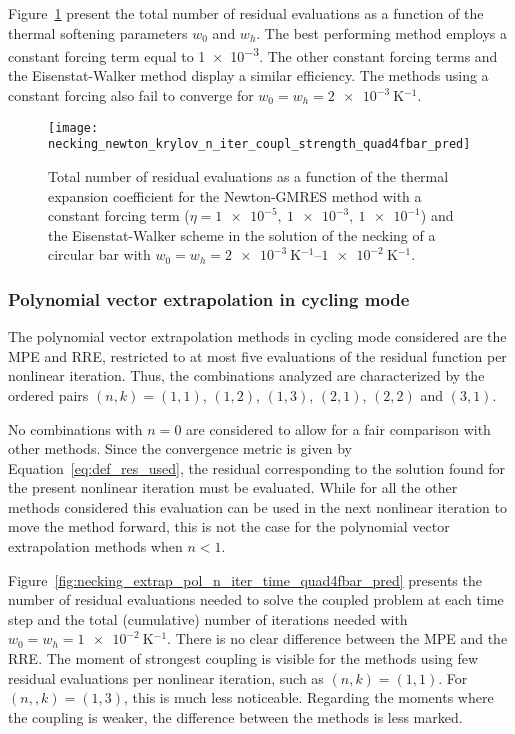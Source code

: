 Figure~\ref{fig:necking_newton_krylov_n_iter_coupl_strength_quad4fbar_pred} present the total number of residual evaluations as a function of the thermal softening parameters \(w_0\) and \(w_h\).
The best performing method employs a constant forcing term equal to \num{1e-3}.
The other constant forcing terms and the Eisenstat-Walker method display a similar efficiency.
The methods using a constant forcing also fail to converge for \(w_0=w_h=\SI{2e-3}{\kelvin^{-1}}\).

\begin{figure}
 \centering
 \texttt{[image: necking\_newton\_krylov\_n\_iter\_coupl\_strength\_quad4fbar\_pred]}
 \caption{Total number of residual evaluations as a function of the thermal expansion coefficient for the Newton-GMRES method with a constant forcing term (\(\eta=\num{1e-5},\ \num{1e-3},\ \num{1e-1}\)) and the Eisenstat-Walker scheme in the solution of the necking of a circular bar with \(w_0=w_h=\SIrange{2e-3}{1e-2}{\kelvin^{-1}}\).}
\label{fig:necking_newton_krylov_n_iter_coupl_strength_quad4fbar_pred}
\end{figure}

\FloatBarrier

\subsubsection{Polynomial vector extrapolation in cycling mode}

The polynomial vector extrapolation methods in cycling mode considered are the MPE and RRE, restricted to at most five evaluations of the residual function per nonlinear iteration.
Thus, the combinations analyzed are characterized by the ordered pairs \((n,k)=(1,1)\), \((1,2)\), \((1,3)\), \((2,1)\), \((2,2)\) and \((3,1)\).

No combinations with \(n=0\) are considered to allow for a fair comparison with other methods.
Since the convergence metric is given by Equation~\eqref{eq:def_res_used}, the residual corresponding to the solution found for the present nonlinear iteration must be evaluated.
While for all the other methods considered this evaluation can be used in the next nonlinear iteration to move the method forward, this is not the case for the polynomial vector extrapolation methods when \(n<1\).

Figure~\ref{fig:necking_extrap_pol_n_iter_time_quad4fbar_pred} presents the number of residual evaluations needed to solve the coupled problem at each time step and the total (cumulative) number of iterations needed with \(w_0=w_h=\SI{1e-2}{\kelvin^{-1}}\).
There is no clear difference between the MPE and the RRE.
The moment of strongest coupling is visible for the methods using few residual evaluations per nonlinear iteration, such as \((n,k)=(1,1)\).
For \((n,,k)=(1,3)\), this is much less noticeable.
Regarding the moments where the coupling is weaker, the difference between the methods is less marked.

